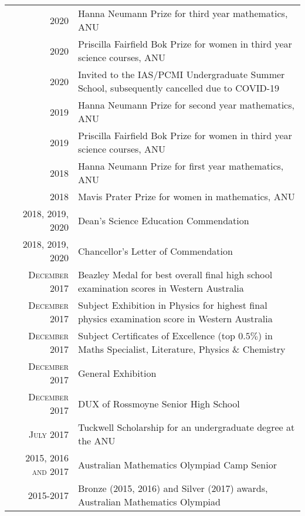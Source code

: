 \documentclass[a4paper,10pt]{article} %
\begin{document}
\begin{tabular}{rl}

2020 & Hanna Neumann Prize \footnotesize for third year mathematics, ANU \normalsize\\

2020 & Priscilla Fairfield Bok Prize \footnotesize for women in third year science courses, ANU \normalsize\\

2020 & Invited to the IAS/PCMI Undergraduate Summer School, \footnotesize subsequently cancelled due to COVID-19 \normalsize\\

2019 & Hanna Neumann Prize \footnotesize for second year mathematics, ANU \normalsize\\

2019 & Priscilla Fairfield Bok Prize \footnotesize for women in third year science courses, ANU \normalsize\\

2018 & Hanna Neumann Prize \footnotesize for first year mathematics, ANU \normalsize\\

2018 & Mavis Prater Prize \footnotesize for women in mathematics, ANU \normalsize\\

2018, 2019, 2020 & Dean's Science Education Commendation\\

2018, 2019, 2020 & Chancellor's Letter of Commendation\\

\textsc{December} 2017 & Beazley Medal \footnotesize for best overall final high school examination scores in Western Australia \normalsize\\

\textsc{December} 2017 & Subject Exhibition in Physics \footnotesize for highest final physics examination score in Western Australia\normalsize\\

\textsc{December} 2017 & Subject Certificates of Excellence (top $0.5\%$) \footnotesize in Maths Specialist, Literature, Physics \& Chemistry\normalsize\\

\textsc{December} 2017 & General Exhibition \footnotesize \normalsize\\

\textsc{December} 2017 & DUX \footnotesize of Rossmoyne Senior High School\normalsize\\

\textsc{July} 2017 & Tuckwell Scholarship \footnotesize for an undergraduate degree at the ANU\\

2015, 2016 \textsc{and} 2017 & Australian Mathematics Olympiad Camp Senior \footnotesize \normalsize\\

2015-2017 & Bronze (2015, 2016) and Silver (2017) awards, Australian Mathematics Olympiad\footnotesize \normalsize\\

\end{tabular}
\end{document}
